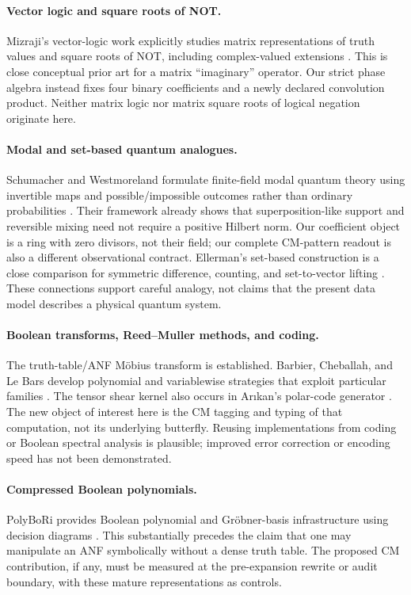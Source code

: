 \paragraph{Vector logic and square roots of NOT.}
Mizraji's vector-logic work explicitly studies matrix representations of truth values and square roots of NOT, including complex-valued extensions \cite{mizraji,mizrajiroots}. This is close conceptual prior art for a matrix ``imaginary'' operator. Our strict phase algebra instead fixes four binary coefficients and a newly declared convolution product. Neither matrix logic nor matrix square roots of logical negation originate here.

\paragraph{Modal and set-based quantum analogues.}
Schumacher and Westmoreland formulate finite-field modal quantum theory using invertible maps and possible/impossible outcomes rather than ordinary probabilities \cite{modal}. Their framework already shows that superposition-like support and reversible mixing need not require a positive Hilbert norm. Our coefficient object is a ring with zero divisors, not their field; our complete CM-pattern readout is also a different observational contract. Ellerman's set-based construction is a close comparison for symmetric difference, counting, and set-to-vector lifting \cite{ellerman}. These connections support careful analogy, not claims that the present data model describes a physical quantum system.

\paragraph{Boolean transforms, Reed--Muller methods, and coding.}
The truth-table/ANF M\"obius transform is established. Barbier, Cheballah, and Le Bars develop polynomial and variablewise strategies that exploit particular families \cite{barbier}. The tensor shear kernel also occurs in Ar\i kan's polar-code generator \cite{arikan}. The new object of interest here is the CM tagging and typing of that computation, not its underlying butterfly. Reusing implementations from coding or Boolean spectral analysis is plausible; improved error correction or encoding speed has not been demonstrated.

\paragraph{Compressed Boolean polynomials.}
PolyBoRi provides Boolean polynomial and Gr\"obner-basis infrastructure using decision diagrams \cite{polybori,polyboridoc}. This substantially precedes the claim that one may manipulate an ANF symbolically without a dense truth table. The proposed CM contribution, if any, must be measured at the pre-expansion rewrite or audit boundary, with these mature representations as controls.

